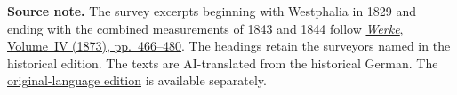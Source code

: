 \par\medskip\begin{small}\noindent\textbf{Source note.} The survey excerpts beginning with Westphalia in 1829 and ending with the combined measurements of 1843 and 1844 follow \href{https://gdz.sub.uni-goettingen.de/id/PPN236005081}{\textit{Werke}, Volume~IV (1873), pp.~466--480}. The headings retain the surveyors named in the historical edition. The texts are AI-translated from the historical German. The \href{https://github.com/KokunoYumeto/gauss-collected-works/releases/tag/gauss-original-language-2026-10-24}{original-language edition} is available separately.\par\end{small}
